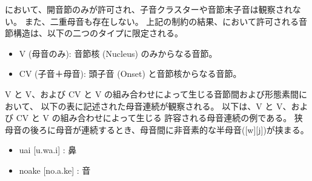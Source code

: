 \langname において、開音節のみが許可され、子音クラスターや音節末子音は観察されない。
また、二重母音も存在しない。
上記の制約の結果、\langname において許可される音節構造は、以下の二つのタイプに限定される。

\begin{itemize}
    \item {V (母音のみ)}: 音節核 (Nucleus) のみからなる音節。
    \item {CV (子音＋母音)}: 頭子音 (Onset) と音節核からなる音節。
\end{itemize}

{V} と {V}、および {CV} と {V} の組み合わせによって生じる音節間および形態素間において、
以下の表に記述された母音連続が観察される。
以下は、{V} と {V}、および {CV} と {V} の組み合わせによって生じる
許容される母音連続の例である。
狭母音の後ろに母音が連続するとき、母音間に非音素的な半母音([w][j])が挟まる。
\begin{itemize}
    \item uai [u.wa.i] : 鼻
    \item noake [no.a.ke] : 音
\end{itemize}
